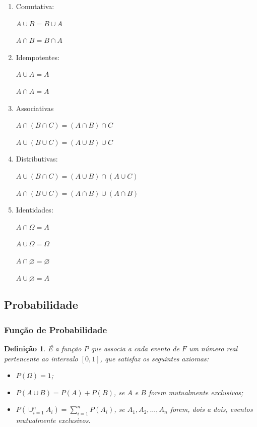 \documentclass[oneside,a4paper,12pt]{article}
\newtheorem{definition}{Definição}[section]
\begin{document}
\begin{enumerate}
	\item Comutativa:
	
	$A \cup B = B \cup A$
	
	$A \cap B = B \cap A$
	
	\item Idempotentes:
	
	$A \cup A = A$
	
	$A \cap A = A$
	
	\item Associativas
	
	$A \cap (B \cap C) = (A \cap B) \cap C$
	
	$A \cup (B \cup C) = (A \cup B) \cup C$
	
	\item Distributivas:
	
	$A \cup (B \cap C) = (A \cup B)\cap (A \cup C)$
	
	$A \cap (B \cup C) = (A \cap B)\cup (A \cap B)$
	
	\item Identidades:
	
	$A \cap \Omega = A$
	
	$A \cup \Omega = \Omega$
	
	$A \cap \varnothing = \varnothing$
	
	$A \cup \varnothing = A$
	
\end{enumerate}

\subsection{Probabilidade}

\subsubsection{Função de Probabilidade}

\begin{definition}
É a função $P$ que associa a cada evento de $F$ um número real pertencente ao intervalo $[0,1]$, que satisfaz os seguintes axiomas:
\begin{itemize}
\item $P(\Omega) = 1$;
\item $P(A \cup B) = P(A) + P(B)$, se $A$ e $B$ forem mutualmente exclusivos;
\item $P\left( \displaystyle\cup_{i=1}^{n} A_i \right) = \displaystyle \sum_{i = 1}^{n}P(A_i)$, se $A_1,A_2,\dots,A_n$ forem, dois a dois, eventos mutualmente exclusivos.
\end{itemize}

\end{definition}
\end{document}
